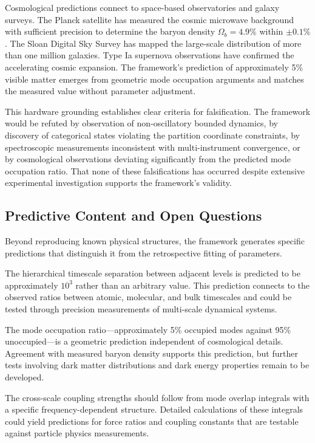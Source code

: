 \documentclass[11pt,a4paper]{article}
\theoremstyle{remark}
\begin{document}
Cosmological predictions connect to space-based observatories and galaxy surveys. The Planck satellite has measured the cosmic microwave background with sufficient precision to determine the baryon density $\Omega_b = 4.9\%$ within $\pm 0.1\%$. The Sloan Digital Sky Survey has mapped the large-scale distribution of more than one million galaxies. Type Ia supernova observations have confirmed the accelerating cosmic expansion. The framework's prediction of approximately 5\% visible matter emerges from geometric mode occupation arguments and matches the measured value without parameter adjustment.

This hardware grounding establishes clear criteria for falsification. The framework would be refuted by observation of non-oscillatory bounded dynamics, by discovery of categorical states violating the partition coordinate constraints, by spectroscopic measurements inconsistent with multi-instrument convergence, or by cosmological observations deviating significantly from the predicted mode occupation ratio. That none of these falsifications has occurred despite extensive experimental investigation supports the framework's validity.

\subsection{Predictive Content and Open Questions}

Beyond reproducing known physical structures, the framework generates specific predictions that distinguish it from the retrospective fitting of parameters.

The hierarchical timescale separation between adjacent levels is predicted to be approximately $10^3$ rather than an arbitrary value. This prediction connects to the observed ratios between atomic, molecular, and bulk timescales and could be tested through precision measurements of multi-scale dynamical systems.

The mode occupation ratio—approximately 5\% occupied modes against 95\% unoccupied—is a geometric prediction independent of cosmological details. Agreement with measured baryon density supports this prediction, but further tests involving dark matter distributions and dark energy properties remain to be developed.

The cross-scale coupling strengths should follow from mode overlap integrals with a specific frequency-dependent structure. Detailed calculations of these integrals could yield predictions for force ratios and coupling constants that are testable against particle physics measurements.
\end{document}
